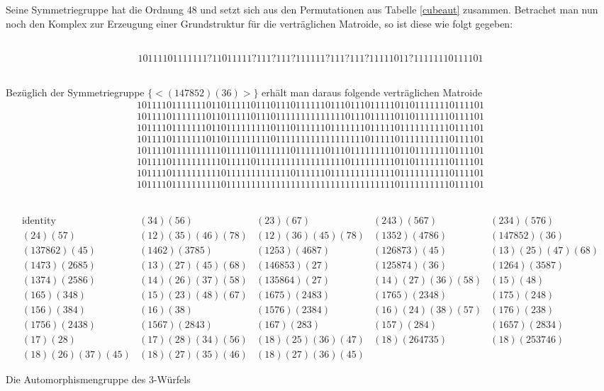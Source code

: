 Seine Symmetriegruppe hat die Ordnung 48 und setzt sich aus den
Permutationen aus Tabelle \ref{cubeaut} zusammen. Betrachet man nun
noch den Komplex zur Erzeugung einer Grundstruktur für die verträglichen
Matroide, so ist diese wie folgt gegeben:

{\small\tt
$$10111101111111?11011111?111?111?111111?111?111?11111011?11111110111101$$
}

Bezüglich der Symmetriegruppe $\{<(147852)(36)>\}$ erhält man daraus folgende
verträglichen Matroide
{\small\tt
$$\begin{array}{c}
1011110111111101101111101110111011111101110111011111011011111110111101\\[1mm]
1011110111111101101111101110111111111111110111011111011011111110111101\\[1mm]
1011110111111101101111111110111011111101111111011111011111111110111101\\[1mm]
1011110111111101101111111110111111111111111111011111011111111110111101\\[1mm]
1011110111111111101111101111111011111101110111111111011011111110111101\\[1mm]
1011110111111111101111101111111111111111110111111111011011111110111101\\[1mm]
1011110111111111101111111111111011111101111111111111011111111110111101\\[1mm]
1011110111111111101111111111111111111111111111111111011111111110111101
\end{array}
$$
}

\begin{table}%
{\footnotesize
$$
\begin{array}{lllll}
\mbox{identity}&(34)(56)&(23)(67)&(243)(567)&(234)(576)\\
(24)(57)&(12)(35)(46)(78)&(12)(36)(45)(78)&(1352)(4786)&(147852)(36)\\
(137862)(45)&(1462)(3785)&(1253)(4687)&(126873)(45)&(13)(25)(47)(68)\\
(1473)(2685)&(13)(27)(45)(68)&(146853)(27)&(125874)(36)&(1264)(3587)\\
(1374)(2586)&(14)(26)(37)(58)&(135864)(27)&(14)(27)(36)(58)&(15)(48)\\
(165)(348)&(15)(23)(48)(67)&(1675)(2483)&(1765)(2348)&(175)(248)\\
(156)(384)&(16)(38)&(1576)(2384)&(16)(24)(38)(57)&(176)(238)\\
(1756)(2438)&(1567)(2843)&(167)(283)&(157)(284)&(1657)(2834)\\
(17)(28)&(17)(28)(34)(56)&(18)(25)(36)(47)&(18)(264735)&(18)(253746)\\
(18)(26)(37)(45)&(18)(27)(35)(46)&(18)(27)(36)(45)
\end{array}$$}
\caption{Die Automorphismengruppe des 3-Würfels}
\label{cubeaut}
\end{table}


